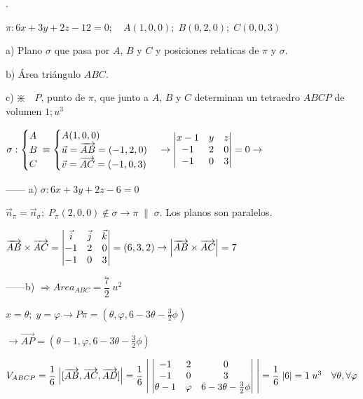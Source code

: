 \begin{ejre}.

\noindent $\pi:6x+3y+2z-12=0;\quad A(1,0,0);\; B(0,2,0);\; C(0,0,3)$ 

a) Plano $\sigma$ que pasa por $A$, $B$ y $C$ y posiciones relaticas de $\pi$ y $\sigma$.

b) Área triángulo $ABC$.

c) $\divideontimes\quad P$, punto de $\pi$, que junto a $A$, $B$ y $C$ determinan un tetraedro $ABCP$ de volumen $1; u^3$
\end{ejre}
\begin{proofw}\renewcommand{\qedsymbol}{$\diamond$}	
\noindent $\sigma:\begin{cases}A\\B\\C \end{cases}\hspace{-3mm}\equiv\begin{cases} A(1,0,0) \\ \vec u=\overrightarrow{AB}=(-1,2,0)\\ \vec v=\overrightarrow{AC}=(-1,0,3)\end{cases} \to \abs{\begin{matrix} x-1&y&z\\-1&2&0\\-1&0&3\end{matrix}}=0 \to$

\noindent ------ a) $ \sigma:6x+3y+2z-6=0$

\noindent $\vec n_{\pi} = \vec n_{\sigma}; \; P_{\pi}(2,0,0)\notin \sigma \to \pi\;\parallel \; \sigma$. Los planos son paralelos.

\noindent $\overrightarrow{AB} \times \overrightarrow{AC}= \abs{\begin{matrix} \vec i&\vec j&\vec k \\ -1&2&0 \\ -1&0&3 \end{matrix}} =(6,3,2) \to \abs{\overrightarrow{AB} \times \overrightarrow{AC}}=7 $

\noindent ------b) $\Rightarrow Area_{ABC}=\dfrac 7 2\; u^2$

\noindent $x=\theta;\; y=\varphi \to P\pi=(\theta,\varphi,6-3\theta-\frac 3 2 \phi)  $

\noindent $\to \overrightarrow{AP}=(\theta-1,\varphi,6-3\theta-\frac 3 2 \phi)$

\noindent $V_{ABCP}=\dfrac 1 6 \; \abs{[\overrightarrow{AB},\overrightarrow{AC},\overrightarrow{AD} ]} = \dfrac 1 6\; \abs{\; \abs{ \begin{matrix} -1&2&0\\-1&0&3 \\ \theta-1&\varphi&6-3\theta-\frac 3 2 \phi  \end{matrix}  } \;}=\dfrac 1 6 \; \abs{6}=1\; u^3 \quad \forall \theta ,\forall \varphi$


\end{proofw}
